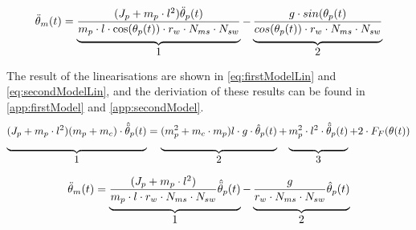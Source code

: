 \begin{align}
\ddot \theta_m(t) = \underbrace{\frac{(J_p + m_p\cdot l^2)\ddot \theta_p(t)}{m_p \cdot l \cdot \cos(\theta_p(t))\cdot r_w \cdot N_{ms} \cdot N_{sw}}\rule[-12pt]{0pt}{5pt}}_{\mbox{1}} - \underbrace{\frac{g \cdot sin(\theta_p(t)}{cos(\theta_p(t))\cdot r_w \cdot N_{ms} \cdot N_{sw}}\rule[-12pt]{0pt}{5pt}}_{\mbox{2}}
\label{eq:secondModel}
\end{align}

The result of the linearisations are shown in \autoref{eq:firstModelLin} and \autoref{eq:secondModelLin}, and the deriviation of these results can be found in \autoref{app:firstModel} and \autoref{app:secondModel}.
\begin{align}
\underbrace{(J_p + m_p \cdot l^2)(m_p + m_c) \cdot \hat{\ddot \theta}_p(t)\rule[-12pt]{0pt}{5pt}}_{\mbox{1}} = \underbrace{(m_p^2 + m_c \cdot m_p)l \cdot g \cdot \hat{\theta}_p(t)\rule[-12pt]{0pt}{5pt}}_{\mbox{2}} + \underbrace{m_p^2 \cdot l^2 \cdot \hat{\ddot \theta}_p(t)\rule[-12pt]{0pt}{5pt}}_{\mbox{3}} + 2 \cdot F_F(\theta(t))
\label{eq:firstModelLin}
\end{align}

\begin{align}
\ddot \theta_m(t) = \underbrace{\frac{(J_p + m_p \cdot l^2)}{m_p \cdot l \cdot r_w \cdot N_{ms} \cdot N_{sw}}\hat{\ddot \theta}_p(t)\rule[-12pt]{0pt}{5pt}}_{\mbox{1}} - \underbrace{\frac{g}{r_w \cdot N_{ms} \cdot N_{sw}} \hat{\theta}_p(t)\rule[-12pt]{0pt}{5pt}}_{\mbox{2}}
\label{eq:secondModelLin}
\end{align}


